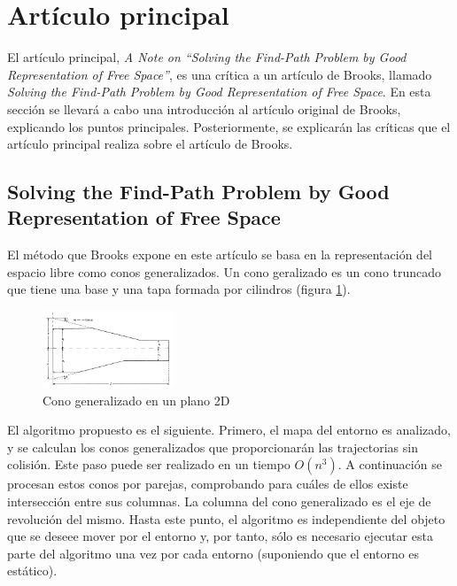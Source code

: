 \section{Artículo principal}
\label{articulo_principal}


El artículo principal, \textit{A Note on ``Solving the Find-Path Problem by Good Representation of Free Space''}, es una crítica a un artículo de Brooks, llamado \textit{Solving the Find-Path Problem by Good Representation of Free Space}. En esta sección se llevará a cabo una introducción al artículo original de Brooks, explicando los puntos principales. Posteriormente, se explicarán las críticas que el artículo principal realiza sobre el artículo de Brooks.

\subsection{Solving the Find-Path Problem by Good Representation of Free Space}

El método que Brooks expone en este artículo se basa en la representación del espacio libre como conos generalizados. Un cono geralizado es un cono truncado que tiene una base y una tapa formada por cilindros (figura \ref{fig:cono_generalizado}).\\

\begin{figure}[h]
		\centering
        \includegraphics[width=0.35\textwidth]{images/cono_gen.png}
        \caption{Cono generalizado en un plano 2D}
        \label{fig:cono_generalizado}
\end{figure} 

El algoritmo propuesto es el siguiente. Primero, el mapa del entorno es analizado, y se calculan los conos generalizados que proporcionarán las trajectorias sin colisión. Este paso puede ser realizado en un tiempo $O(n^3)$. A continuación se procesan estos conos por parejas, comprobando para cuáles de ellos existe intersección entre sus columnas. La columna del cono generalizado es el eje de revolución del mismo. Hasta este punto, el algoritmo es independiente del objeto que se deseee mover por el entorno y, por tanto, sólo es necesario ejecutar esta parte del algoritmo una vez por cada entorno (suponiendo que el entorno es estático).\\

